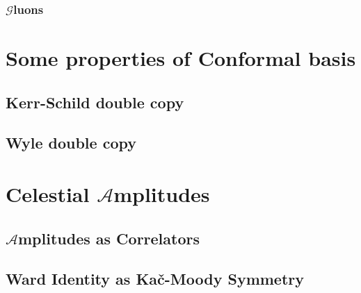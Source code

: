 \subsubsection{$\mathcal{G}$luons}
\section{Some properties of Conformal basis}
\subsection{Kerr-Schild double copy}
\subsection{Wyle double copy}
\section{Celestial $\mathcal{A}$mplitudes}
\subsection{$\mathcal{A}$mplitudes as Correlators}
\subsection{Ward Identity as Ka\v{c}-Moody Symmetry}